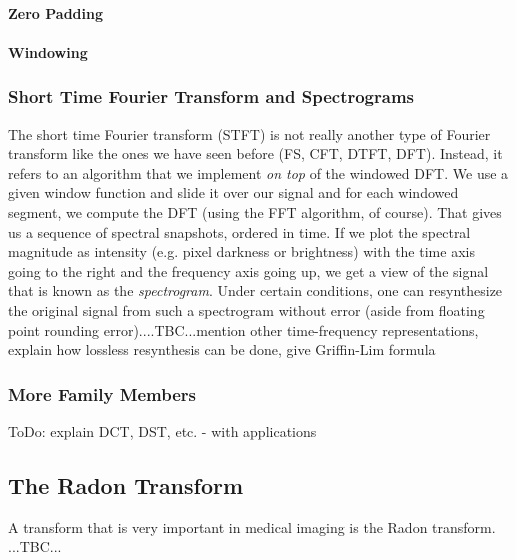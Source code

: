 \paragraph{Zero Padding}

\paragraph{Windowing}


\subsubsection{Short Time Fourier Transform and Spectrograms}
The short time Fourier transform (STFT) is not really another type of Fourier transform like the ones we have seen before (FS, CFT, DTFT, DFT). Instead, it refers to an algorithm that we implement \emph{on top} of the windowed DFT. We use a given window function and slide it over our signal and for each windowed segment, we compute the DFT (using the FFT algorithm, of course). That gives us a sequence of spectral snapshots, ordered in time. If we plot the spectral magnitude as intensity (e.g. pixel darkness or brightness) with the time axis going to the right and the frequency axis going up, we get a view of the signal that is known as the \emph{spectrogram}. Under certain conditions, one can resynthesize the original signal from such a spectrogram without error (aside from floating point rounding error)....TBC...mention other time-frequency representations, explain how lossless resynthesis can be done, give Griffin-Lim formula



\subsubsection{More Family Members}
ToDo: explain DCT, DST, etc. - with applications


\subsection{The Radon Transform}
A transform that is very important in medical imaging is the Radon transform. ...TBC...




